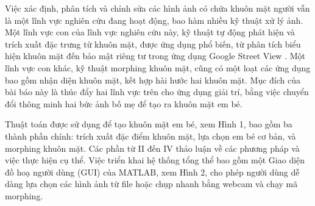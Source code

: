 \documentclass[journal]{IEEEtran}
\begin{document}
Việc xác định, phân tích và chỉnh sửa các hình ảnh có chứa khuôn mặt người vẫn là một lĩnh vực nghiên cứu đang hoạt động, bao hàm nhiều kỹ thuật xử lý ảnh. Một lĩnh vực con của lĩnh vực nghiên cứu này, kỹ thuật tự động phát hiện và trích xuất đặc trưng từ khuôn mặt, được ứng dụng phổ biến, từ phân tích biểu hiện khuôn mặt đến bảo mật riêng tư trong ứng dụng Google Street View \cite{ref:r1}. Một lĩnh vực con khác, kỹ thuật morphing khuôn mặt, cũng có một loạt các ứng dụng bao gồm nhận diện khuôn mặt, kết hợp hài hước hai khuôn mặt. Mục đích của bài báo này là thúc đẩy hai lĩnh vực trên cho ứng dụng giải trí, bằng việc chuyển đổi thông minh hai bức ảnh bố mẹ để tạo ra khuôn mặt em bé.

Thuật toán được sử dụng để tạo khuôn mặt em bé, xem Hình 1, bao gồm ba thành phần chính: trích xuất đặc điểm khuôn mặt, lựa chọn em bé cơ bản, và morphing khuôn mặt. Các phần từ II đến IV thảo luận về các phương pháp và việc thực hiện cụ thể. Việc triển khai hệ thống tổng thể bao gồm một Giao diện đồ hoạ người dùng (GUI) của MATLAB, xem Hình 2, cho phép người dùng dễ dàng lựa chọn các hình ảnh từ file hoặc chụp nhanh bằng webcam và chạy mã morphing.
\end{document}
